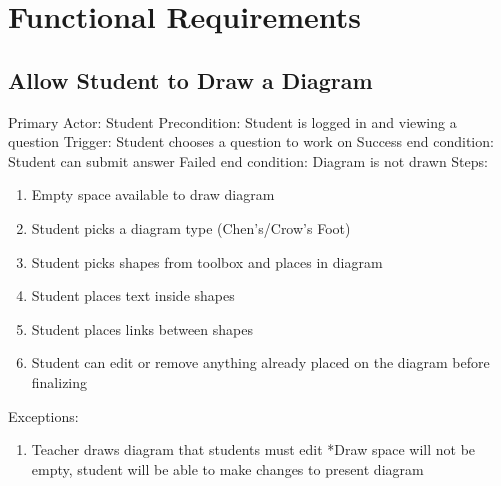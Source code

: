     \chapter{Functional Requirements}
    \section{Allow Student to Draw a Diagram}
        Primary Actor: Student \newline
        Precondition: Student is logged in and viewing a            question \newline
        Trigger: Student chooses a question to work on \newline
        Success end condition: Student can submit answer            \newline
        Failed end condition: Diagram is not drawn \newline
        \newline
        Steps:
        \begin{enumerate}
            \item{Empty space available to draw diagram}
            \item{Student picks a diagram type (Chen’s/Crow’s Foot)}
            \item{Student picks shapes from toolbox and places in           diagram}
            \item{Student places text inside shapes}
            \item{Student places links between shapes}
            \item{Student can edit or remove anything already placed on the diagram before finalizing}
        \end{enumerate}
        Exceptions:
        \begin{enumerate}
            \item{Teacher draws diagram that students must edit             \newline
                *Draw space will not be empty, student will be able to           make changes to present diagram}
        \end{enumerate}

    
